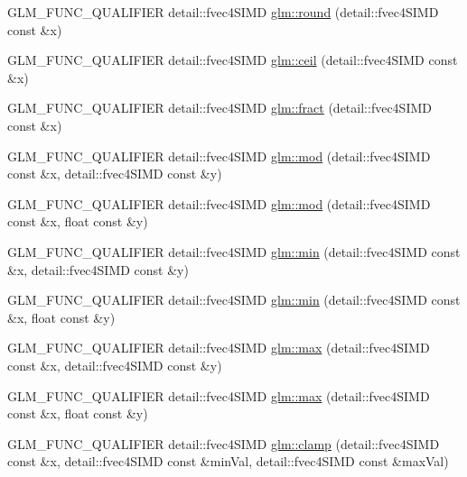 \begin{DoxyCompactItemize}
\item 
G\+L\+M\+\_\+\+F\+U\+N\+C\+\_\+\+Q\+U\+A\+L\+I\+F\+I\+E\+R detail\+::fvec4\+S\+I\+M\+D \hyperlink{namespaceglm_ac38130a4224e740980925150ea8dae5e}{glm\+::round} (detail\+::fvec4\+S\+I\+M\+D const \&x)
\item 
G\+L\+M\+\_\+\+F\+U\+N\+C\+\_\+\+Q\+U\+A\+L\+I\+F\+I\+E\+R detail\+::fvec4\+S\+I\+M\+D \hyperlink{namespaceglm_adc50f5413973998fb007fda7a6149ef5}{glm\+::ceil} (detail\+::fvec4\+S\+I\+M\+D const \&x)
\item 
G\+L\+M\+\_\+\+F\+U\+N\+C\+\_\+\+Q\+U\+A\+L\+I\+F\+I\+E\+R detail\+::fvec4\+S\+I\+M\+D \hyperlink{namespaceglm_a5a003d7f27903c03744ca6271f1a9051}{glm\+::fract} (detail\+::fvec4\+S\+I\+M\+D const \&x)
\item 
G\+L\+M\+\_\+\+F\+U\+N\+C\+\_\+\+Q\+U\+A\+L\+I\+F\+I\+E\+R detail\+::fvec4\+S\+I\+M\+D \hyperlink{namespaceglm_a560289b95e600d6da427ad473c1f46cf}{glm\+::mod} (detail\+::fvec4\+S\+I\+M\+D const \&x, detail\+::fvec4\+S\+I\+M\+D const \&y)
\item 
G\+L\+M\+\_\+\+F\+U\+N\+C\+\_\+\+Q\+U\+A\+L\+I\+F\+I\+E\+R detail\+::fvec4\+S\+I\+M\+D \hyperlink{namespaceglm_a66a9b0ed141fd219673b9adf8e400ec0}{glm\+::mod} (detail\+::fvec4\+S\+I\+M\+D const \&x, float const \&y)
\item 
G\+L\+M\+\_\+\+F\+U\+N\+C\+\_\+\+Q\+U\+A\+L\+I\+F\+I\+E\+R detail\+::fvec4\+S\+I\+M\+D \hyperlink{namespaceglm_af6ef9739a4145dc0004408132eff235b}{glm\+::min} (detail\+::fvec4\+S\+I\+M\+D const \&x, detail\+::fvec4\+S\+I\+M\+D const \&y)
\item 
G\+L\+M\+\_\+\+F\+U\+N\+C\+\_\+\+Q\+U\+A\+L\+I\+F\+I\+E\+R detail\+::fvec4\+S\+I\+M\+D \hyperlink{namespaceglm_ace53be5aa101f55503d1fd863ac97de3}{glm\+::min} (detail\+::fvec4\+S\+I\+M\+D const \&x, float const \&y)
\item 
G\+L\+M\+\_\+\+F\+U\+N\+C\+\_\+\+Q\+U\+A\+L\+I\+F\+I\+E\+R detail\+::fvec4\+S\+I\+M\+D \hyperlink{namespaceglm_a8003e838df57188edaa8b8fe512516a6}{glm\+::max} (detail\+::fvec4\+S\+I\+M\+D const \&x, detail\+::fvec4\+S\+I\+M\+D const \&y)
\item 
G\+L\+M\+\_\+\+F\+U\+N\+C\+\_\+\+Q\+U\+A\+L\+I\+F\+I\+E\+R detail\+::fvec4\+S\+I\+M\+D \hyperlink{namespaceglm_a6a8611ddc96e204e7669872c6a68b972}{glm\+::max} (detail\+::fvec4\+S\+I\+M\+D const \&x, float const \&y)
\item 
G\+L\+M\+\_\+\+F\+U\+N\+C\+\_\+\+Q\+U\+A\+L\+I\+F\+I\+E\+R detail\+::fvec4\+S\+I\+M\+D \hyperlink{namespaceglm_a5c4a12e002e5eb23b8a12639c7484378}{glm\+::clamp} (detail\+::fvec4\+S\+I\+M\+D const \&x, detail\+::fvec4\+S\+I\+M\+D const \&min\+Val, detail\+::fvec4\+S\+I\+M\+D const \&max\+Val)

\end{DoxyCompactItemize}

